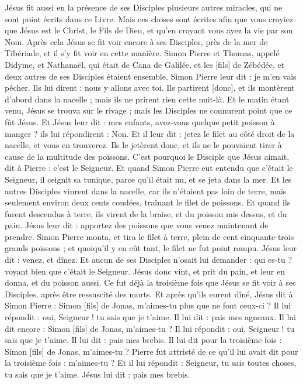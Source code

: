\begin{multicols}{2}
Jésus fit aussi en la présence de ses Disciples plusieurs autres miracles, qui ne sont point écrits dans ce Livre.
Mais ces choses sont écrites afin que vous croyiez que Jésus est le Christ, le Fils de Dieu, et qu'en croyant vous ayez la vie par son Nom.
\VerseOne{}Après cela Jésus se fit voir encore à ses Disciples, près de la mer de Tibériade, et il s'y fit voir en cette manière.
Simon Pierre et Thomas, appelé Didyme, et Nathanaël, qui était de Cana de Galilée, et les [fils] de Zébédée, et deux autres de ses Disciples étaient ensemble.
Simon Pierre leur dit : je m'en vais pêcher. Ils lui dirent : nous y allons avec toi. Ils partirent [donc], et ils montèrent d'abord dans la nacelle ; mais ils ne prirent rien cette nuit-là.
Et le matin étant venu, Jésus se trouva sur le rivage ; mais les Disciples ne connurent point que ce fût Jésus.
Et Jésus leur dit : mes enfants, avez-vous quelque petit poisson à manger ? ils lui répondirent : Non.
Et il leur dit : jetez le filet au côté droit de la nacelle, et vous en trouverez. Ils le jetèrent donc, et ils ne le pouvaient tirer à cause de la multitude des poissons.
C'est pourquoi le Disciple que Jésus aimait, dit à Pierre : c'est le Seigneur. Et quand Simon Pierre eut entendu que c'était le Seigneur, il ceignit sa tunique, parce qu'il était nu, et se jeta dans la mer.
Et les autres Disciples vinrent dans la nacelle, car ils n'étaient pas loin de terre, mais seulement environ deux cents coudées, traînant le filet de poissons.
Et quand ils furent descendus à terre, ils virent de la braise, et du poisson mis dessus, et du pain.
Jésus leur dit : apportez des poissons que vous venez maintenant de prendre.
Simon Pierre monta, et tira le filet à terre, plein de cent cinquante-trois grands poissons ; et quoiqu'il y en eût tant, le filet ne fut point rompu.
Jésus leur dit : venez, et dînez. Et aucun de ses Disciples n'osait lui demander : qui es-tu ? voyant bien que c'était le Seigneur.
Jésus donc vint, et prit du pain, et leur en donna, et du poisson aussi.
Ce fut déjà la troisième fois que Jésus se fit voir à ses Disciples, après être ressuscité des morts.
Et après qu'ils eurent dîné, Jésus dit à Simon Pierre : Simon [fils] de Jonas, m'aimes-tu plus que ne font ceux-ci ? Il lui répondit : oui, Seigneur ! tu sais que je t'aime. Il lui dit : pais mes agneaux.
Il lui dit encore : Simon [fils] de Jonas, m'aimes-tu ? Il lui répondit : oui, Seigneur ! tu sais que je t'aime. Il lui dit : pais mes brebis.
Il lui dit pour la troisième fois : Simon [fils] de Jonas, m'aimes-tu ? Pierre fut attristé de ce qu'il lui avait dit pour la troisième fois : m'aimes-tu ? Et il lui répondit : Seigneur, tu sais toutes choses, tu sais que je t'aime. Jésus lui dit : pais mes brebis.

\end{multicols}
